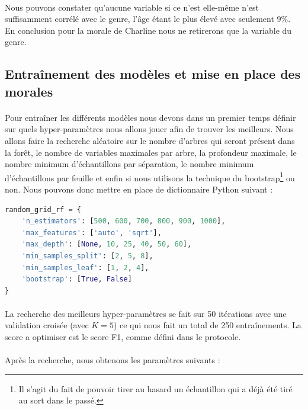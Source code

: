 \documentclass[10pt, french, a4paper]{report}
\begin{document}
\paragraph{}
Nous pouvons constater qu'aucune variable si ce n'est elle-même n'est suffisamment corrélé avec le genre, l'âge étant le plus élevé avec seulement 9\%. En conclusion pour la morale de Charline nous ne retirerons que la variable du genre.

\subsection{Entraînement des modèles et mise en place des morales}

\paragraph{}
Pour entraîner les différents modèles nous devons dans un premier temps définir sur quels hyper-paramètres nous allons jouer afin de trouver les meilleurs. Nous allons faire la recherche aléatoire sur le nombre d'arbres qui seront présent dans la forêt, le nombre de variables maximales par arbre, la profondeur maximale, le nombre minimum d'échantillons par séparation, le nombre minimum d'échantillons par feuille et enfin si nous utilisons la technique du bootstrap\footnote{Il s'agit du fait de pouvoir tirer au hasard un échantillon qui a déjà été tiré au sort dans le passé.} ou non. Nous pouvons donc mettre en place de dictionnaire Python suivant :

\begin{lstlisting}[language=python]
  random_grid_rf = { 
    'n_estimators': [500, 600, 700, 800, 900, 1000],
    'max_features': ['auto', 'sqrt'],
    'max_depth': [None, 10, 25, 40, 50, 60],
    'min_samples_split': [2, 5, 8],
    'min_samples_leaf': [1, 2, 4],
    'bootstrap': [True, False]
}
\end{lstlisting}

\paragraph{}
La recherche des meilleurs hyper-paramètres se fait sur 50 itérations avec une validation croisée (avec $K=5$) ce qui nous fait un total de 250 entraînements. La score a optimiser est le score F1, comme défini dans le protocole. 

\paragraph{}
Après la recherche, nous obtenons les paramètres suivants : 
\end{document}
